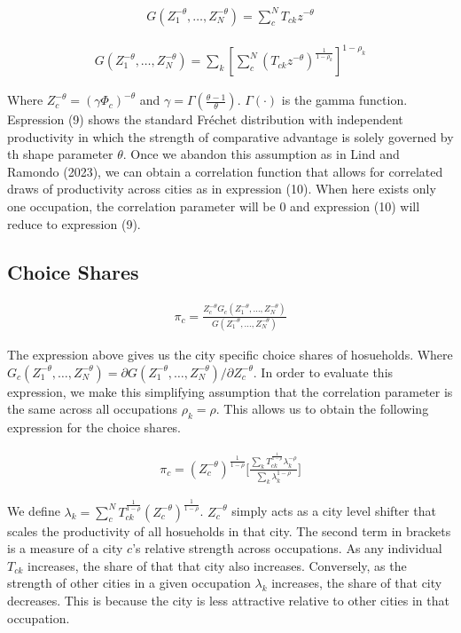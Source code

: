 \documentclass[10pt]{article}
\begin{document}
\begin{align}
    G(Z_1^{- \theta}, \dots, Z_N^{- \theta}) = \sum_{c}^{N} T_{ck} z^{- \theta}
\end{align}

\begin{align}
    G(Z_1^{- \theta}, \dots, Z_N^{- \theta}) = \sum_{k}^{} \left[ \sum_{c}^{N} (T_{ck} z^{- \theta})^{\frac{1}{1 - \rho_k}} \right]^{1 - \rho_k}
\end{align}

Where $Z_c^{- \theta} = (\gamma \Phi_c)^{- \theta}$ and $\gamma = \Gamma \left( \frac{\theta - 1}{\theta} \right)$. $\Gamma(\cdot)$ is the gamma function. Espression (9) shows the standard Fr\'{e}chet distribution with independent productivity in which the strength of comparative advantage is solely governed by th shape parameter $\theta$. Once we abandon this assumption as in Lind and Ramondo (2023), we can obtain a correlation function that allows for correlated draws of productivity across cities as in expression (10). When here exists only one occupation, the correlation parameter will be 0 and expression (10) will reduce to expression (9).

\subsection{Choice Shares}

\begin{align}
    \pi_c = \frac{Z_c^{- \theta} G_c(Z_1^{- \theta}, \dots, Z_N^{- \theta})}{G(Z_1^{- \theta}, \dots, Z_N^{- \theta})}
\end{align}

The expression above gives us the city specific choice shares of hosueholds. Where $G_c(Z_1^{- \theta}, \dots, Z_N^{- \theta}) = \partial G(Z_1^{- \theta}, \dots, Z_N^{- \theta}) / \partial Z_c^{- \theta}$. In order to evaluate this expression, we make this simplifying assumption that the correlation parameter is the same across all occupations $\rho_k = \rho$. This allows us to obtain the following expression for the choice shares.

\begin{align}
    \pi_{c} = (Z_{c}^{-\theta})^{\frac{1}{1-\rho}}\Bigg[\frac{\sum\limits_{k}{T^{\frac{1}{1-\rho}}_{ck}}\lambda_{k}^{-\rho}}{\sum\limits_{k}\lambda_{k}^{1-\rho}}\Bigg]
\end{align}

We define $\lambda_k = \sum\limits_{c}^{N}{T^{\frac{1}{1-\rho}}_{ck}}(Z_{c}^{-\theta})^{\frac{1}{1-\rho}}$. $Z_c^{- \theta}$ simply acts as a city level shifter that scales the productivity of all hosueholds in that city. The second term in brackets is a measure of a city $c$'s relative strength across occupations. As any individual $T_{ck}$ increases, the share of that that city also increases. Conversely, as the strength of other cities in a given occupation $\lambda_k$ increases, the share of that city decreases. This is because the city is less attractive relative to other cities in that occupation.
\end{document}

